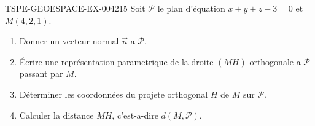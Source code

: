 \begin{exercice}{TSPE-GEOESPACE-EX-004}{2}{15}
Soit $\mathcal{P}$ le plan d'équation $x+y+z-3=0$ et $M(4,2,1)$.
\begin{enumerate}
  \item Donner un vecteur normal $\vec{n}$ a $\mathcal{P}$.
  \item Écrire une représentation parametrique de la droite $(MH)$ orthogonale a $\mathcal{P}$ passant par $M$.
  \item Déterminer les coordonnées du projete orthogonal $H$ de $M$ sur $\mathcal{P}$.
  \item Calculer la distance $MH$, c'est-a-dire $d(M,\mathcal{P})$.
\end{enumerate}
\end{exercice}
